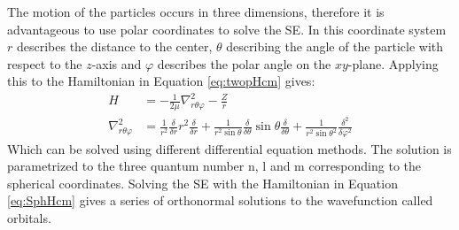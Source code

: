\documentclass[../master_thesis.tex]{subfiles}
\begin{document}
The motion of the particles occurs in three dimensions, therefore it is
advantageous to use polar coordinates to solve the \ac{SE}. In this coordinate
system $r$ describes the distance to the center, $\theta$ describing the angle
of the particle with respect to the $z$-axis and $\varphi$ describes the polar
angle on the $xy$-plane. Applying this to the Hamiltonian in Equation
\ref{eq:twopHcm} gives:
\begin{equation}
  \begin{align}
    H &= -\frac{1}{2\mu}\nabla^2_{r\theta\varphi} - \frac{Z}{r}\\
    \nabla^2_{r\theta\varphi} &=
    \frac{1}{r^2}\frac{\delta}{\delta r}r^2\frac{\delta}{\delta r}
    + \frac{1}{r^2 \sin{\theta}}\frac{\delta}{\delta\theta}\sin{\theta}
      \frac{\delta}{\delta\theta}
    + \frac{1}{r^2\sin{\theta}^2}\frac{\delta^2}{\delta\varphi^2}
    \label{eq:SphHcm}
  \end{align}
\end{equation}
Which can be solved using different differential equation methods. The solution
is parametrized to the three quantum number n, l and m corresponding to the
spherical coordinates. Solving the \ac{SE} with the Hamiltonian in Equation
\ref{eq:SphHcm} gives a series of orthonormal solutions to the wavefunction
called orbitals.




\biblio
\end{document}
